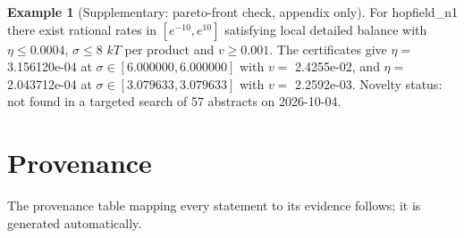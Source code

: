 \documentclass[11pt]{article}
\theoremstyle{definition}\newtheorem{definition}[theorem]{Definition}\newtheorem{example}[theorem]{Example}
\begin{document}
\begin{example}[Supplementary: pareto-front check, appendix only]
For hopfield\_n1 there exist rational rates in \([e^{-10},e^{10}]\) satisfying local detailed balance with \(\eta\le 0.0004\), \(\sigma\le 8\) \(kT\) per product and \(v\ge 0.001\). The certificates give \(\eta=\) 3.156120e-04 at \(\sigma\in[6.000000,6.000000]\) with \(v=\) 2.4255e-02, and \(\eta=\) 2.043712e-04 at \(\sigma\in[3.079633,3.079633]\) with \(v=\) 2.2592e-03. Novelty status: not found in a targeted search of 57 abstracts on 2026-10-04.
\end{example}

\section{Provenance}\label{provenance}

The provenance table mapping every statement to its evidence follows; it is generated automatically.
\end{document}
